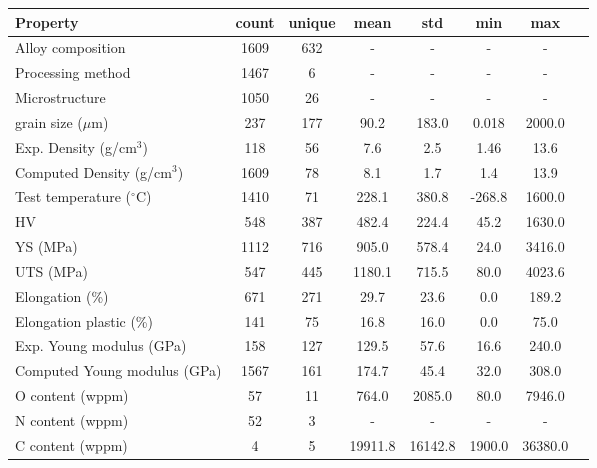 \begin{tabular}{lccccccc}
\toprule
Property & count & unique & mean & std & min & max \\
\midrule
Alloy composition & 1609 & 632 & - & - & - & - \\
Processing method & 1467 & 6 & - & - & - & - \\
Microstructure & 1050 & 26 & - & - & - & - \\
grain size ($\mu$m) & 237 & 177 & 90.2 & 183.0 & 0.018 & 2000.0 \\
Exp. Density (g/cm$^3$) & 118 & 56 & 7.6 & 2.5 & 1.46 & 13.6 \\
Computed Density (g/cm$^3$) & 1609 & 78 & 8.1 & 1.7 & 1.4 & 13.9 \\
Test temperature ($^\circ$C) & 1410 & 71 & 228.1 & 380.8 & -268.8 & 1600.0 \\
HV & 548 & 387 & 482.4 & 224.4 & 45.2 & 1630.0 \\
YS (MPa) & 1112 & 716 & 905.0 & 578.4 & 24.0 & 3416.0 \\
UTS (MPa) & 547 & 445 & 1180.1 & 715.5 & 80.0 & 4023.6 \\
Elongation (\%) & 671 & 271 & 29.7 & 23.6 & 0.0 & 189.2 \\
Elongation plastic (\%) & 141 & 75 & 16.8 & 16.0 & 0.0 & 75.0 \\
Exp. Young modulus (GPa) & 158 & 127 & 129.5 & 57.6 & 16.6 & 240.0 \\
Computed Young modulus (GPa) & 1567 & 161 & 174.7 & 45.4 & 32.0 & 308.0 \\
O content (wppm) & 57 & 11 & 764.0 & 2085.0 & 80.0 & 7946.0 \\
N content (wppm) & 52 & 3 & - & - & - & - \\
C content (wppm) & 4 & 5 & 19911.8 & 16142.8 & 1900.0 & 36380.0 \\
\bottomrule
\end{tabular}
